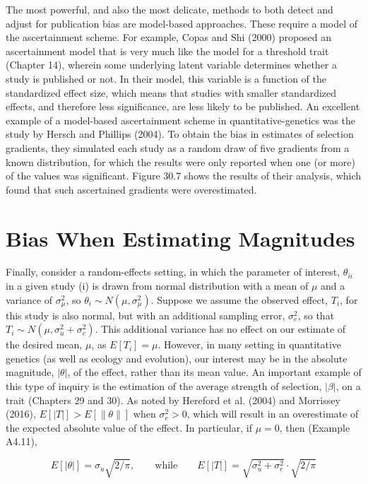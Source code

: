 \documentclass{article}
\begin{document}
The most powerful, and also the most delicate, methods to both detect and adjust for publication bias are model-based approaches. These require a model of the ascertainment scheme. For example, Copas and Shi (2000) proposed an ascertainment model that is very much like the model for a threshold trait (Chapter 14), wherein some underlying latent variable determines whether a study is published or not. In their model, this variable is a function of the standardized effect size, which means that studies with smaller standardized effects, and therefore less significance, are less likely to be published. An excellent example of a model-based ascertainment scheme in quantitative-genetics was the study by Hersch and Phillips (2004). To obtain the bias in estimates of selection gradients, they simulated each study as a random draw of five gradients from a known distribution, for which the results were only reported when one (or more) of the values was significant. Figure 30.7 shows the results of their analysis, which found that such ascertained gradients were overestimated.

\section{Bias When Estimating Magnitudes}
Finally, consider a random-effects setting, in which the parameter of interest, $\theta_{ii}$ in a given study (i) is drawn from normal distribution with a mean of $\mu$ and a variance of $\sigma_{\mu}^{2}$, so $\theta_{i} \sim N(\mu, \sigma_{\mu}^{2})$. Suppose we assume the observed effect, $T_{i}$, for this study is also normal, but with an additional sampling error, $\sigma_{e}^{2}$, so that $T_{i} \sim N(\mu, \sigma_{u}^{2} + \sigma_{e}^{2})$. This additional variance has no effect on our estimate of the desired mean, $\mu$, as $E[T_{i}] = \mu$. However, in many setting in quantitative genetics (as well as ecology and evolution), our interest may be in the absolute magnitude, $|\theta|$, of the effect, rather than its mean value. An important example of this type of inquiry is the estimation of the average strength of selection, $|\beta|$, on a trait (Chapters 29 and 30). As noted by Hereford et al. (2004) and Morrissey (2016), $E[|T|] > E[\|\theta\|]$ when $\sigma_{e}^{2} > 0$, which will result in an overestimate of the expected absolute value of the effect. In particular, if $\mu = 0$, then (Example A4.11),

\begin{equation}
E[|\theta|]=\sigma_{u}\sqrt{2/\pi},\qquad\mathrm{w h i l e}\qquad E[|T|]=\sqrt{\sigma_{u}^{2}+\sigma_{e}^{2}}\cdot\sqrt{2/\pi}
\end{equation}
\end{document}
